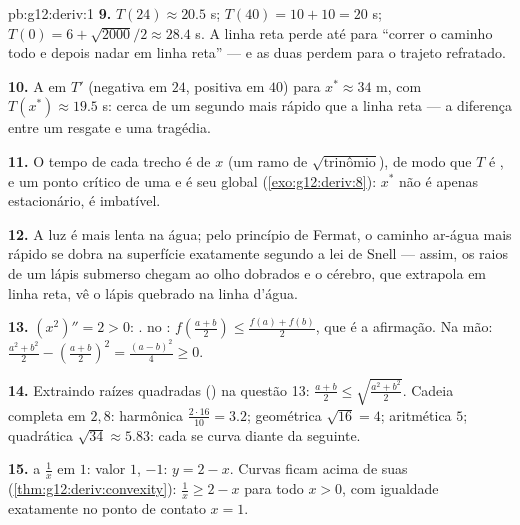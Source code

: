 \begin{solution}{pb:g12:deriv:1}
\textbf{9.} $T(24) \approx 20.5$ s; $T(40) = 10 + 10 = 20$ s;
$T(0) = 6 + \sqrt{2000}/2 \approx 28.4$ s. A linha reta perde
até para ``correr o caminho todo e depois nadar em linha reta''
--- e as duas perdem para o trajeto refratado.

\textbf{10.} A  em $T'$ (negativa em $24$, positiva em
$40$)  para $x^* \approx 34$ m, com
$T(x^*) \approx 19.5$ s: cerca de um segundo mais rápido que a
linha reta --- a diferença entre um resgate e uma tragédia.

\textbf{11.} O tempo de cada trecho é   de $x$ (um
ramo de $\sqrt{\text{trinômio}}$), de modo que $T$ é , e
um ponto crítico de uma   e  é seu 
global (\cref{exo:g12:deriv:8}): $x^*$ não é apenas
estacionário, é imbatível.

\textbf{12.} A luz é mais lenta na água; pelo princípio de
Fermat, o caminho ar-água mais rápido se dobra na superfície
exatamente segundo a lei de Snell --- assim, os raios de um
lápis submerso chegam ao olho dobrados e o cérebro, que
extrapola em linha reta, vê o lápis quebrado na linha d'água.

\textbf{13.} $(x^2)'' = 2 > 0$: .  no : $f\left(\frac{a+b}{2}\right) \leq
\frac{f(a) + f(b)}{2}$, que é a afirmação. Na mão:
$\frac{a^2 + b^2}{2} - \left(\frac{a+b}{2}\right)^2 =
\frac{(a - b)^2}{4} \geq 0$.

\textbf{14.} Extraindo raízes quadradas () na
questão 13: $\frac{a + b}{2} \leq \sqrt{\frac{a^2 + b^2}{2}}$.
Cadeia completa em $2, 8$: harmônica
$\frac{2 \cdot 16}{10} = 3.2$; geométrica $\sqrt{16} = 4$;
aritmética $5$; quadrática $\sqrt{34} \approx 5.83$: cada 
se curva diante da seguinte.

\textbf{15.}  a $\frac1x$ em $1$: valor $1$,  $-1$: $y = 2 - x$. Curvas  ficam acima de suas
 (\cref{thm:g12:deriv:convexity}):
$\frac1x \geq 2 - x$ para todo $x > 0$, com igualdade
exatamente no ponto de contato $x = 1$.


\end{solution}
